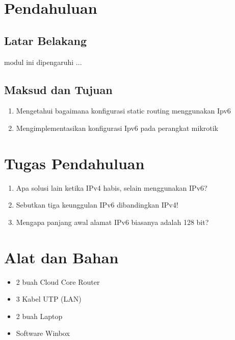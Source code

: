 \section{Pendahuluan}
\subsection{Latar Belakang}
modul ini dipengaruhi ...

\subsection{Maksud dan Tujuan}
\begin{center}
    \begin{enumerate}
        \item Mengetahui bagaimana konfigurasi static routing menggunakan Ipv6
        \item Mengimplementasikan konfigurasi Ipv6 pada perangkat mikrotik
    \end{enumerate}
\end{center}

\section{Tugas Pendahuluan}
\begin{center}
	\colorbox{cyan!30}{\parbox{0.8\linewidth}{
    \begin{enumerate}
        \item Apa solusi lain ketika IPv4 habis, selain menggunakan IPv6?
        \item Sebutkan tiga keunggulan IPv6 dibandingkan IPv4!
        \item Mengapa panjang awal alamat IPv6 biasanya adalah 128 bit?
    \end{enumerate}}}
\end{center}

\section{Alat dan Bahan}
\begin{itemize}[label=$\bullet$, itemsep=-1pt, leftmargin=*]
	\item 2 buah Cloud Core Router
	\item 3 Kabel UTP (LAN)
	\item 2 buah Laptop
	\item Software Winbox
\end{itemize}

